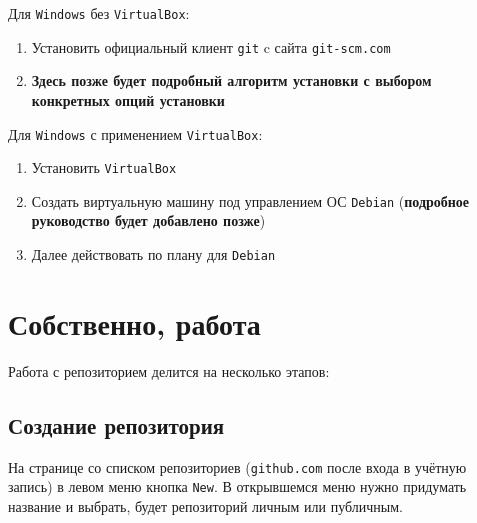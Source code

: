 \documentclass[oneside, final, 12pt]{article}
\begin{document}
Для \texttt{Windows} без \texttt{VirtualBox}:
\begin{enumerate}
\item Установить официальный клиент \texttt{git} c сайта \texttt{git-scm.com}
\item {\bf Здесь позже будет подробный алгоритм установки с выбором конкретных опций установки}
\end{enumerate}

Для \texttt{Windows} с применением \texttt{VirtualBox}:
\begin{enumerate}
\item Установить \texttt{VirtualBox}
\item Создать виртуальную машину под управлением ОС \texttt{Debian} ({\bf подробное руководство будет добавлено позже})
\item Далее действовать по плану для \texttt{Debian}
\end{enumerate}

\section{Собственно, работа}
Работа с репозиторием делится на несколько этапов:
\subsection{Создание репозитория}
На странице со списком репозиториев (\texttt{github.com} после входа в учётную запись) в левом меню кнопка \texttt{New}. В открывшемся меню нужно придумать название и выбрать, будет репозиторий личным или публичным.
\end{document}
